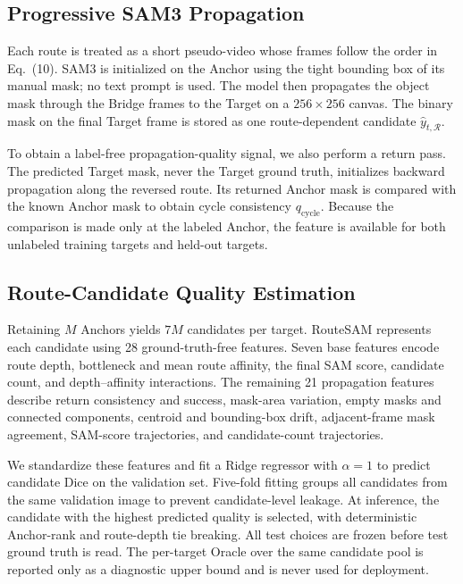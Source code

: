 \documentclass[a4paper,fleqn]{cas-dc}
\begin{document}
\subsection{Progressive SAM3 Propagation}\label{sec:sam3-propagation}

Each route is treated as a short pseudo-video whose frames follow the order in Eq.~(10). SAM3 is initialized on the Anchor using the tight bounding box of its manual mask; no text prompt is used. The model then propagates the object mask through the Bridge frames to the Target on a $256\times256$ canvas. The binary mask on the final Target frame is stored as one route-dependent candidate $\hat{y}_{t,\mathcal{R}}$.

To obtain a label-free propagation-quality signal, we also perform a return pass. The predicted Target mask, never the Target ground truth, initializes backward propagation along the reversed route. Its returned Anchor mask is compared with the known Anchor mask to obtain cycle consistency $q_{\mathrm{cycle}}$. Because the comparison is made only at the labeled Anchor, the feature is available for both unlabeled training targets and held-out targets.

\subsection{Route-Candidate Quality Estimation}\label{sec:router}

Retaining $M$ Anchors yields $7M$ candidates per target. RouteSAM represents each candidate using 28 ground-truth-free features. Seven base features encode route depth, bottleneck and mean route affinity, the final SAM score, candidate count, and depth--affinity interactions. The remaining 21 propagation features describe return consistency and success, mask-area variation, empty masks and connected components, centroid and bounding-box drift, adjacent-frame mask agreement, SAM-score trajectories, and candidate-count trajectories.

We standardize these features and fit a Ridge regressor with $\alpha=1$ to predict candidate Dice on the validation set. Five-fold fitting groups all candidates from the same validation image to prevent candidate-level leakage. At inference, the candidate with the highest predicted quality is selected, with deterministic Anchor-rank and route-depth tie breaking. All test choices are frozen before test ground truth is read. The per-target Oracle over the same candidate pool is reported only as a diagnostic upper bound and is never used for deployment.
\end{document}

